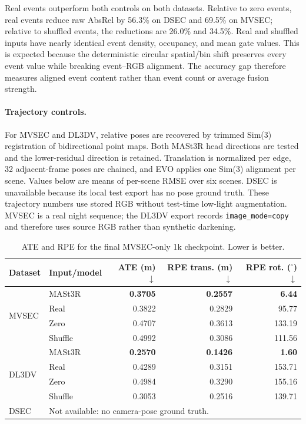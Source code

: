 \documentclass[10pt]{article}
\begin{document}
Real events outperform both controls on both datasets.  Relative to zero
events, real events reduce raw AbsRel by 56.3\% on DSEC and 69.5\% on MVSEC;
relative to shuffled events, the reductions are 26.0\% and 34.5\%.  Real and
shuffled inputs have nearly identical event density, occupancy, and mean gate
values.  This is expected because the deterministic circular spatial/bin shift
preserves every event value while breaking event--RGB alignment.  The accuracy
gap therefore measures aligned event content rather than event count or average
fusion strength.

\paragraph{Trajectory controls.}
For MVSEC and DL3DV, relative poses are recovered by trimmed Sim(3)
registration of bidirectional point maps.  Both MASt3R head directions are
tested and the lower-residual direction is retained.  Translation is normalized
per edge, 32 adjacent-frame poses are chained, and EVO applies one Sim(3)
alignment per scene.  Values below are means of per-scene RMSE over six scenes.
DSEC is unavailable because its local test export has no pose ground truth.
These trajectory numbers use stored RGB without test-time low-light
augmentation.  MVSEC is a real night sequence; the DL3DV export records
\texttt{image\_mode=copy} and therefore uses source RGB rather than synthetic
darkening.

\begin{table}[t]
\centering
\caption{ATE and RPE for the final MVSEC-only 1k checkpoint.  Lower is better.}
\label{tab:event-control-pose}
\begin{tabular}{llrrr}
\toprule
Dataset & Input/model & ATE (m) $\downarrow$ & RPE trans. (m) $\downarrow$ & RPE rot. ($^\circ$) $\downarrow$ \\
\midrule
\multirow{4}{*}{MVSEC} & MASt3R & \textbf{0.3705} & \textbf{0.2557} & \textbf{6.44} \\
 & Real & 0.3822 & 0.2829 & 95.77 \\
 & Zero & 0.4707 & 0.3613 & 133.19 \\
 & Shuffle & 0.4992 & 0.3086 & 111.56 \\
\midrule
\multirow{4}{*}{DL3DV} & MASt3R & \textbf{0.2570} & \textbf{0.1426} & \textbf{1.60} \\
 & Real & 0.4289 & 0.3151 & 153.71 \\
 & Zero & 0.4984 & 0.3290 & 155.16 \\
 & Shuffle & 0.3053 & 0.2516 & 139.71 \\
\midrule
DSEC & \multicolumn{4}{l}{Not available: no camera-pose ground truth.} \\
\bottomrule
\end{tabular}
\end{table}
\end{document}
